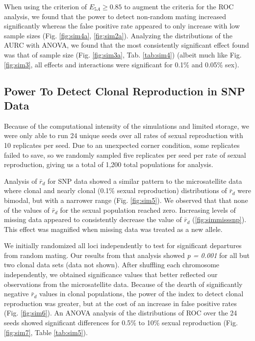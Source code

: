 \documentclass[]{article}
\theoremstyle{definition}
\theoremstyle{definition}
\theoremstyle{definition}
\theoremstyle{remark}
\begin{document}
When using the criterion of \(E_{5A} \geq 0.85\) to augment the criteria
for the ROC analysis, we found that the power to detect non-random
mating increased significantly whereas the false positive rate appeared
to only increase with low sample sizes (Fig. \ref{fig:sim4a},
\ref{fig:sim2a}). Analyzing the distributions of the AURC with ANOVA, we
found that the most consistently significant effect found was that of
sample size (Fig. \ref{fig:sim3a}, Tab. \ref{tab:sim4}) (albeit much
like Fig. \ref{fig:sim3}, all effects and interactions were significant
for 0.1\% and 0.05\% sex).

\subsection{Power To Detect Clonal Reproduction in SNP
Data}\label{power-to-detect-clonal-reproduction-in-snp-data}

Because of the computational intensity of the simulations and limited
storage, we were only able to run 24 unique seeds over all rates of
sexual reproduction with 10 replicates per seed. Due to an unexpected
corner condition, some replicates failed to save, so we randomly sampled
five replicates per seed per rate of sexual reproduction, giving us a
total of 1,200 total populations for analysis.

Analysis of \(\bar{r}_d\) for SNP data showed a similar pattern to the
microsatellite data where clonal and nearly clonal (0.1\% sexual
reproduction) distributions of \(\bar{r}_d\) were bimodal, but with a
narrower range (Fig. \ref{fig:sim5}). We observed that that none of the
values of \(\bar{r}_d\) for the sexual population reached zero.
Increasing levels of missing data appeared to consistently decrease the
value of \(\bar{r}_d\) (\ref{fig:simmisssnp}). This effect was magnified
when missing data was treated as a new allele.

We initially randomized all loci independently to test for significant
departures from random mating. Our results from that analysis showed
\emph{p = 0.001} for all but two clonal data sets (data not shown).
After shuffling each chromosome independently, we obtained significance
values that better reflected our observations from the microsatellite
data. Because of the dearth of significantly negative \(\bar{r}_d\)
values in clonal populations, the power of the index to detect clonal
reproduction was greater, but at the cost of an increase in false
positive rates (Fig. \ref{fig:sim6}). An ANOVA analysis of the
distributions of ROC over the 24 seeds showed significant differences
for 0.5\% to 10\% sexual reproduction (Fig. \ref{fig:sim7}, Table
\ref{tab:sim5}).
\end{document}
